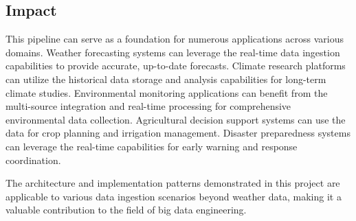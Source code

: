 \documentclass[12pt,a4paper]{article}
\begin{document}
\subsection{Impact}

This pipeline can serve as a foundation for numerous applications across various domains. Weather forecasting systems can leverage the real-time data ingestion capabilities to provide accurate, up-to-date forecasts. Climate research platforms can utilize the historical data storage and analysis capabilities for long-term climate studies. Environmental monitoring applications can benefit from the multi-source integration and real-time processing for comprehensive environmental data collection. Agricultural decision support systems can use the data for crop planning and irrigation management. Disaster preparedness systems can leverage the real-time capabilities for early warning and response coordination.

The architecture and implementation patterns demonstrated in this project are applicable to various data ingestion scenarios beyond weather data, making it a valuable contribution to the field of big data engineering.

\newpage
\end{document}
